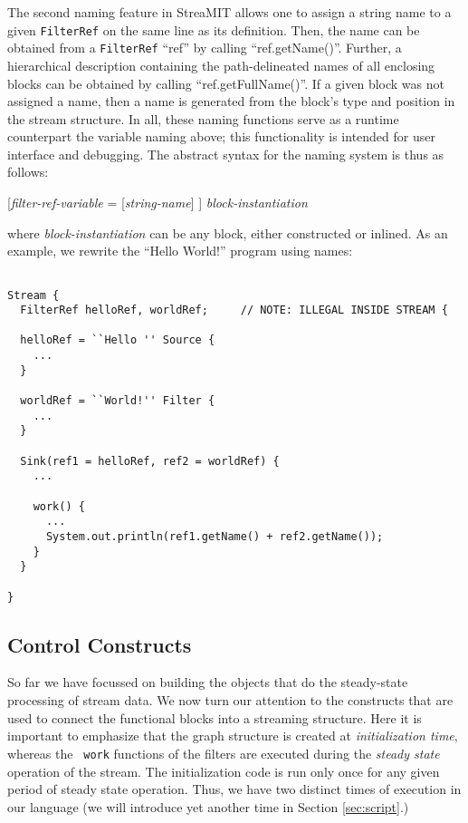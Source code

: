 \documentclass[draft]{article}
\begin{document}
The second naming feature in StreaMIT allows one to assign a string
name to a given {\tt FilterRef} on the same line as its definition.
Then, the name can be obtained from a {\tt FilterRef} ``ref'' by
calling ``ref.getName()''.  Further, a hierarchical description
containing the path-delineated names of all enclosing blocks can be
obtained by calling ``ref.getFullName()''.  If a given block was not
assigned a name, then a name is generated from the block's type and
position in the stream structure.  In all, these naming functions
serve as a runtime counterpart the variable naming above; this
functionality is intended for user interface and debugging.  The
abstract syntax for the naming system is thus as follows:

[{\it filter-ref-variable} = [{\it string-name}] ] {\it block-instantiation}

where {\it block-instantiation} can be any block, either constructed
or inlined.  As an example, we rewrite the ``Hello World!'' program
using names:

\begin{verbatim} 

Stream {
  FilterRef helloRef, worldRef;		// NOTE: ILLEGAL INSIDE STREAM {

  helloRef = ``Hello '' Source {
	...
  }

  worldRef = ``World!'' Filter {
	...
  }

  Sink(ref1 = helloRef, ref2 = worldRef) {
    ...
    
    work() {
      ...
      System.out.println(ref1.getName() + ref2.getName());
    }
  }

}

\end{verbatim}

\subsection{Control Constructs}
\protect\label{sec:control}

So far we have focussed on building the objects that do the
steady-state processing of stream data.  We now turn our attention to
the constructs that are used to connect the functional blocks into a
streaming structure.  Here it is important to emphasize that the graph
structure is created at {\it initialization time}, whereas the {\tt
work} functions of the filters are executed during the {\it steady
state} operation of the stream.  The initialization code is run only
once for any given period of steady state operation.  Thus, we have
two distinct times of execution in our language (we will introduce yet
another time in Section {\ref{sec:script}}.)
\end{document}
